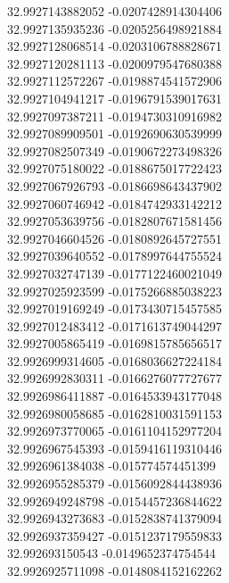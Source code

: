 {32.9927143882052	-0.0207428914304406\\
32.9927135935236	-0.0205256498921884\\
32.9927128068514	-0.0203106788828671\\
32.9927120281113	-0.0200979547680388\\
32.9927112572267	-0.0198874541572906\\
32.9927104941217	-0.0196791539017631\\
32.9927097387211	-0.0194730310916982\\
32.9927089909501	-0.0192690630539999\\
32.9927082507349	-0.0190672273498326\\
32.9927075180022	-0.0188675017722423\\
32.9927067926793	-0.0186698643437902\\
32.9927060746942	-0.0184742933142212\\
32.9927053639756	-0.0182807671581456\\
32.9927046604526	-0.0180892645727551\\
32.9927039640552	-0.0178997644755524\\
32.9927032747139	-0.0177122460021049\\
32.9927025923599	-0.0175266885038223\\
32.9927019169249	-0.0173430715457585\\
32.9927012483412	-0.0171613749044297\\
32.9927005865419	-0.0169815785656517\\
32.9926999314605	-0.0168036627224184\\
32.9926992830311	-0.0166276077727677\\
32.9926986411887	-0.0164533943177048\\
32.9926980058685	-0.0162810031591153\\
32.9926973770065	-0.0161104152977204\\
32.9926967545393	-0.0159416119310446\\
32.9926961384038	-0.015774574451399\\
32.9926955285379	-0.0156092844438936\\
32.9926949248798	-0.0154457236844622\\
32.9926943273683	-0.0152838741379094\\
32.9926937359427	-0.0151237179559833\\
32.992693150543	-0.0149652374754544\\
32.9926925711098	-0.0148084152162262\\
}
